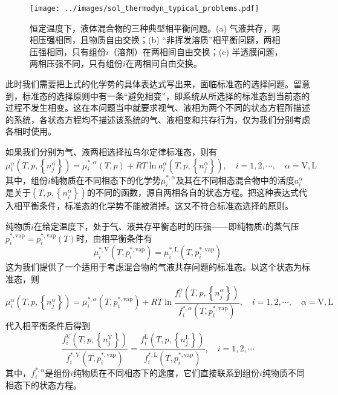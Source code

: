 \documentclass[main.tex]{subfiles}
\begin{document}
\begin{figure}[ht]
  \centering
  \texttt{[image: ../images/sol\_thermodyn\_typical\_problems.pdf]}
  \caption{恒定温度下，液体混合物的三种典型相平衡问题。(a) 气液共存，两相压强相同，且物质自由交换；(b) “非挥发溶质”相平衡问题，两相压强相同，只有组份$i$（溶剂）在两相间自由交换；(c) 半透膜问题，两相压强不同，只有组份$i$在两相间自由交换。}
  \label{fig:sol_thermodyn_typical_problems}
\end{figure}

此时我们需要把上式的化学势的具体表达式写出来，面临标准态的选择问题。留意到，标准态的选择原则中有一条“避免相变”，即系统从所选择的标准态到当前态的过程不发生相变。这在本问题当中就要求视气、液相为两个不同的状态方程所描述的系统，各状态方程均不描述该系统的气、液相变和共存行为，仅为我们分别考虑各相时使用。

如果我们分别为气、液两相选择拉乌尔定律标准态，则有
\begin{equation*}
  \mu_i^\alpha\left(T,p,\left\{n_j^\alpha\right\}\right)=\mu_i^{*,\alpha}\left(T,p\right)+RT\ln a_i^\alpha\left(T,p,\left\{n_j^\alpha\right\}\right),\quad i=1,2,\cdots,\quad \alpha=\text{V},\text{L}
\end{equation*}
其中，组份$i$纯物质在不同相态下的化学势$\mu_i^{*,\alpha}$及其在不同相态混合物中的活度$a_i^\alpha$是关于$\left(T,p,\left\{n_i^\alpha\right\}\right)$的不同的函数，源自两相各自的状态方程。把这种表达式代入相平衡条件，标准态的化学势不能被消掉。这又不符合标准态选择的原则。

纯物质$i$在给定温度下，处于气、液共存平衡态时的压强——即纯物质$i$的蒸气压$p_i^{*,\text{vap}}=p_i^{*,\text{vap}}\left(T\right)$时，由相平衡条件有
\[\mu_i^{*,\text{V}}\left(T,p_i^{*,\text{vap}}\right)=\mu_i^{*,\text{L}}\left(T,p_i^{*,\text{vap}}\right)\]
这为我们提供了一个适用于考虑混合物的气液共存问题的标准态。以这个状态为标准态，则
\begin{equation}\label{eq:II.5_chemical_potential_vapor_liquid_equilibrium}
  \mu_i^\alpha\left(T,p,\left\{n_j^\alpha\right\}\right)=\mu_i^{*,\alpha}\left(T,p_i^{*,\text{vap}}\right)+RT\ln\frac{f_i^\alpha\left(T,p,\left\{n_j^\alpha\right\}\right)}{f_i^{*,\alpha}\left(T,p_i^{*,\text{vap}}\right)},\quad i=1,2,\cdots,\quad\alpha=\text{V},\text{L}
\end{equation}
代入相平衡条件后得到
\begin{equation}\label{eq:II.5_vapor-liquid_equilibrium_fugacity}
  \frac{f_i^\text{V}\left(T,p,\left\{n_j^\text{V}\right\}\right)}{f_i^{*,\text{V}}\left(T,p_i^{*,\text{vap}}\right)}=\frac{f_i^\text{L}\left(T,p,\left\{n_j^\text{L}\right\}\right)}{f_i^{*,\text{L}}\left(T,p_i^{*,\text{vap}}\right)},\quad i=1,2,\cdots
\end{equation}
其中，$f_i^{*,\alpha}$是组份$i$纯物质在不同相态下的逸度，它们直接联系到组份$i$纯物质不同相态下的状态方程。
\end{document}

